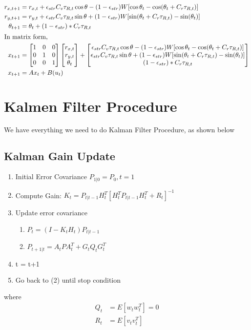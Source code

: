 \documentclass[12pt, letterpaper]{amsart} %
\numberwithin{equation}{section}
\begin{document}
\begin{align*}
  r_{x,t+1} &= r_{x,t} + \epsilon_{str}  C_v \tau_{R,t} \cos \theta - (1-\epsilon_{str})W[\cos \theta_t - \cos (\theta_t + C_r \tau_{R,t})]\\
  r_{y,t+1} &= r_{y,t} + \epsilon_{str}  C_v \tau_{R,t} \sin \theta + (1-\epsilon_{str})W[\sin (\theta_t + C_r \tau_{R,t}) - \sin (\theta_t)]\\
  \theta_{t+1} &= \theta_t + (1 - \epsilon_{str}) * C_r \tau_{R,t} \\
  \intertext{In matrix form,}
  x_{t+1} &=
            \begin{bmatrix}
              1 & 0 & 0 \\
              0 & 1 & 0 \\
              0 & 0 & 1
            \end{bmatrix}
            \begin{bmatrix}
              r_{x,t} \\
              r_{y,t} \\
              \theta_t
            \end{bmatrix}
            +
  \begin{bmatrix}
  \epsilon_{str}  C_v \tau_{R,t} \cos \theta - (1-\epsilon_{str})W[\cos \theta_t - \cos (\theta_t + C_r \tau_{R,t})]\\
  \epsilon_{str}  C_v \tau_{R,t} \sin \theta + (1-\epsilon_{str})W[\sin (\theta_t + C_r \tau_{R,t}) - \sin (\theta_t)]\\
  (1 - \epsilon_{str}) * C_r \tau_{R,t} \\    
            \end{bmatrix}
  \\
  x_{t+1} &= A x_{t} + B(u_t)
\end{align*}

\newpage
\section{Kalmen Filter Procedure}
We have everything we need to do Kalman Filter Procedure, as shown below
\subsection{Kalman Gain Update}
\begin{enumerate}
\item Initial Error Covariance $P_{1|0} = P_0, t = 1$
\item Compute Gain: $K_t = P_{t|t-1} H_t^T [H_t^T P_{t|t-1} H_t^T + R_t]^{-1}$
\item Update error covariance
  \begin{enumerate}
  \item $P_t = (I-K_tH_t)P_{t|t-1}$
  \item $P_{t+1|t} = A_t P A_t^T + G_t Q_t G_t^T$
  \end{enumerate}
\item t = t+1
\item Go back to (2) until stop condition
\end{enumerate}
where
\begin{align*}
  Q_t &= E[w_t w_t^T] = 0\\  
  R_t &= E[v_t v_t^T]
\end{align*}
\end{document}
